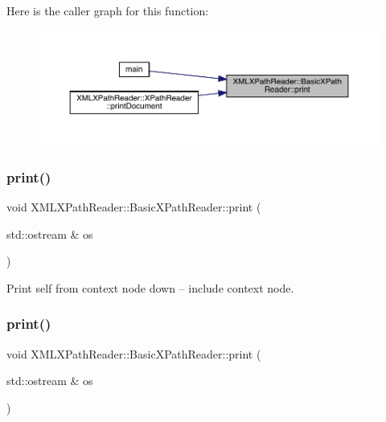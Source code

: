 Here is the caller graph for this function\+:
\nopagebreak
\begin{figure}[H]
\begin{center}
\leavevmode
\includegraphics[width=350pt]{d6/dbf/classXMLXPathReader_1_1BasicXPathReader_a846e0ac9b2835040cb615a9585e2a999_icgraph}
\end{center}
\end{figure}
\mbox{\label{classXMLXPathReader_1_1BasicXPathReader_a846e0ac9b2835040cb615a9585e2a999}} 
\subsubsection{\texorpdfstring{print()}{print()}\hspace{0.1cm}{\footnotesize\ttfamily [2/3]}}
{\footnotesize\ttfamily void X\+M\+L\+X\+Path\+Reader\+::\+Basic\+X\+Path\+Reader\+::print (\begin{DoxyParamCaption}\item[{std\+::ostream \&}]{os }\end{DoxyParamCaption})}



Print self from context node down -- include context node. 

\mbox{\label{classXMLXPathReader_1_1BasicXPathReader_a846e0ac9b2835040cb615a9585e2a999}} 
\subsubsection{\texorpdfstring{print()}{print()}\hspace{0.1cm}{\footnotesize\ttfamily [3/3]}}
{\footnotesize\ttfamily void X\+M\+L\+X\+Path\+Reader\+::\+Basic\+X\+Path\+Reader\+::print (\begin{DoxyParamCaption}\item[{std\+::ostream \&}]{os }\end{DoxyParamCaption})}



